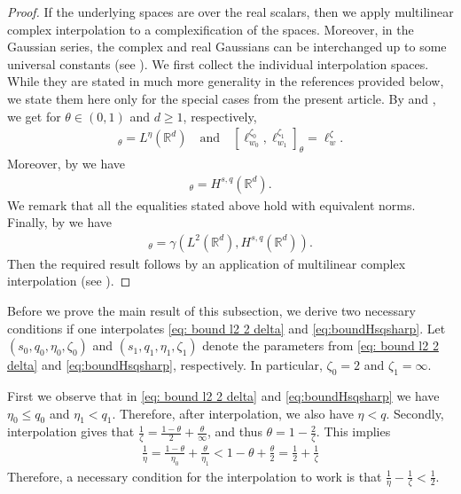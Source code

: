 \documentclass[reqno]{amsart}
\theoremstyle{plain}
\theoremstyle{remark}
\theoremstyle{plain}
\numberwithin{equation}{section}
\def\R{{\mathbb R}}
\newcommand{\1}{\one}
\begin{document}
\begin{proof}
If the underlying spaces are over the real scalars, then we apply multilinear complex interpolation to a complexification of the spaces. Moreover, in the Gaussian series, the complex and real Gaussians can be interchanged up to some universal constants (see \cite[Proposition 6.1.21]{HNVW2}). We first collect the individual interpolation spaces. While they are stated in much more generality in the references provided below, we state them here only for the special cases from the present article.
    By \cite[Theorem 2.2.6]{HNVW1} and \cite[Theorem 14.3.1]{HNVW3},
    we get for $\theta\in (0,1)$ and $d\geq 1$, respectively,
    \begin{align}
        [L^{\eta_0}(\R^d),L^{\eta_1}(\R^d)]_\theta = L^\eta(\R^d)
        \quad\text{and}\quad
        [\ell^{\zeta_0}_{w_0},\ell^{\zeta_1}_{w_1}]_\theta = \ell^\zeta_w.
    \end{align}
    Moreover, by \cite[Theorem 14.7.12]{HNVW3} we have
    \begin{align}
        [H^{s_0,q_0}(\R^d),H^{s_1,q_1}(\R^d)]_\theta = H^{s,q}(\R^d).
    \end{align}
    We remark that all the equalities stated above hold with equivalent norms. Finally, by \cite[Theorem 9.1.25]{HNVW2} we have
    \begin{align}
        [\gamma(L^2(\R^d),H^{s_0,q_0}(\R^d)),\gamma(L^2(\R^d),H^{s_1,q_1}(\R^d))]_\theta = \gamma(L^2(\R^d),H^{s,q}(\R^d)).
    \end{align}
    Then the required result follows by an application of multilinear complex interpolation (see \cite[Section 4.4]{BeLo}).
\end{proof}


Before we prove the main result of this subsection, we derive two necessary conditions if one interpolates \eqref{eq: bound l2 2 delta} and \eqref{eq:boundHsqsharp}. Let $(s_0, q_0, \eta_0, \zeta_0)$ and $(s_1, q_1, \eta_1, \zeta_1)$ denote the parameters from \eqref{eq: bound l2 2 delta} and \eqref{eq:boundHsqsharp}, respectively. In particular, $\zeta_0=2$ and $\zeta_1= \infty$. 

First we observe that in \eqref{eq: bound l2 2 delta} and \eqref{eq:boundHsqsharp} we have $\eta_0\leq q_0$ and $\eta_1< q_1$. Therefore, after interpolation, we also have $\eta<q$.
Secondly, interpolation gives that $\frac1\zeta = \frac{1-\theta}{2} + \frac{\theta}{\infty}$, and thus $\theta = 1-\frac{2}{\zeta}$. This implies
\begin{align*}
\frac1\eta = \frac{1-\theta}{\eta_0} + \frac{\theta}{\eta_1} <1-\theta + \frac{\theta}{2} = \frac12 + \frac{1}{\zeta}
\end{align*}
Therefore, a necessary condition for the interpolation to work is that $\frac1\eta-\frac{1}{\zeta}<\frac12$. 
\end{document}
